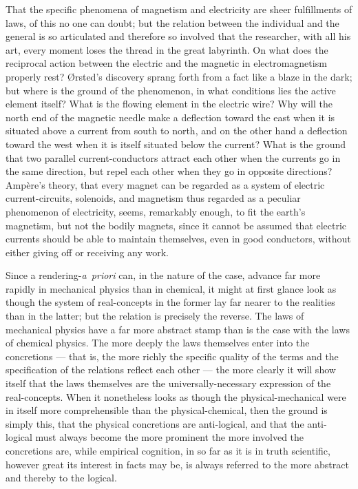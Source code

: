 \documentclass[12pt]{book}
\begin{document}
That the specific phenomena of magnetism and electricity are sheer fulfillments of laws,
of this no one can doubt; but the relation between the individual and the general is so
articulated and therefore so involved that the researcher, with all his art, every
moment loses the thread in the great labyrinth. On what does the reciprocal action
between the electric and the magnetic in electromagnetism properly rest? Ørsted's
discovery sprang forth from a fact like a blaze in the dark; but where is the ground of
the phenomenon, in what conditions lies the active element itself? What is the flowing
element in the electric wire? Why will the north end of the magnetic needle make a
deflection toward the east when it is situated above a current from south to north, and
on the other hand a deflection toward the west when it is itself situated below the
current? What is the ground that two parallel current-conductors attract each other when
the currents go in the same direction, but repel each other when they go in opposite
directions? Ampère's theory, that every magnet can be regarded as a system of electric
current-circuits, solenoids, and magnetism thus regarded as a peculiar phenomenon of
electricity, seems, remarkably enough, to fit the earth's magnetism, but not the bodily
magnets, since it cannot be assumed that electric currents should be able to maintain
themselves, even in good conductors, without either giving off or receiving any work.

Since a rendering-\textit{a~priori} can, in the nature of the case, advance far more
rapidly in mechanical physics than in chemical, it might at first glance look as though
the system of real-concepts in the former lay far nearer to the realities than in the
latter; but the relation is precisely the reverse. The laws of mechanical physics have a
far more abstract stamp than is the case with the laws of chemical physics. The more
deeply the laws themselves enter into the concretions --- that is, the more richly the
specific quality of the terms and the specification of the relations reflect each other
--- the more clearly it will show itself that the laws themselves are the
universally-necessary expression of the real-concepts. When it nonetheless looks as
though the physical-mechanical were in itself more comprehensible than the
physical-chemical, then the ground is simply this, that the physical concretions are
anti-logical, and that the anti-logical must always become the more prominent the more
involved the concretions are, while empirical cognition, in so far as it is in truth
scientific, however great its interest in facts may be, is always referred to the more
abstract and thereby to the logical.
\end{document}
